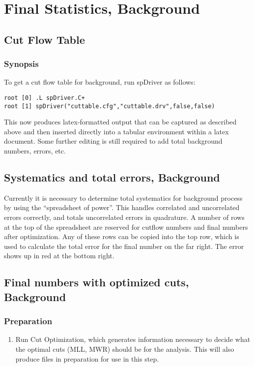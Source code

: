 \documentclass[english]{article}
\begin{document}
\section{Final Statistics, Background}

\subsection{Cut Flow Table}

\subsubsection{Synopsis}
%
To get a cut flow table for background, run spDriver as follows:
%
\begin{lstlisting}
root [0] .L spDriver.C+
root [1] spDriver("cuttable.cfg","cuttable.drv",false,false)
\end{lstlisting}

This now produces latex-formatted output that can be captured as
described above and then inserted directly into a tabular environment
within a latex document. Some further editing is still required to
add total background numbers, errors, etc.

\subsection{Systematics and total errors, Background}

Currently it is necessary to determine total systematics
for background process by using the ``spreadsheet of power''.
This handles correlated and uncorrelated errors correctly,
and totals uncorrelated errors in quadrature. A number of
rows at the top of the spreadsheet are reserved for cutflow
numbers and final numbers after optimization. Any of these
rows can be copied into the top row, which is used to calculate
the total error for the final number on the far right. The
error shows up in red at the bottom right.

\subsection{Final numbers with optimized cuts, Background}

\subsubsection{Preparation}
%
\begin{enumerate}
\item Run Cut Optimization, which generates information necessary to
decide what the optimal cuts (MLL, MWR) should be for the analysis.
This will also produce files in preparation for use in this step.
\end{enumerate}
\end{document}
